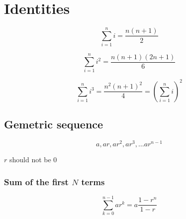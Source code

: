 \section{Identities}


$$ \sum_{i=1}^{n} i = \frac{n(n+1)}{2}  $$

$$\sum_{i=1}^{n} i^{2} = \frac{n(n+1)(2n+1)}{6}  $$

$$\sum_{i=1}^{n} i^{3} = \frac{n^{2}(n+1)^{2}}{4} = \left(\sum_{i=1}^n i\right)^2$$

\subsection{Gemetric sequence}

\begin{equation}
  a, ar, ar^2, ar^3, \ldots ar^{n-1}
  \label{eq:Geometric sequence definition}
\end{equation}

$r$ should not be $0$

\subsubsection{Sum of the first $N$ terms}

\begin{equation}
  \sum_{k=0}^{n-1} ar^k =  a  \frac{1 - r^n}{1-r}
  \label{eq:Sum of the first N terms in a geometric sequence}
\end{equation}
